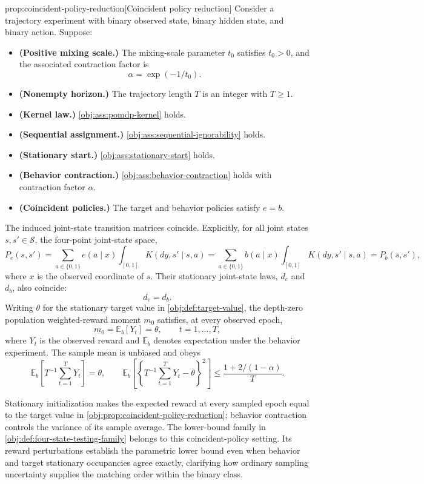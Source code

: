 \documentclass[11pt]{article}
\begin{document}
\begin{propositionv}{prop:coincident-policy-reduction}[Coincident policy reduction]
Consider a trajectory experiment with binary observed state, binary hidden state, and binary action. Suppose:
\begin{itemize}
\item \textbf{(Positive mixing scale.)} The mixing-scale parameter \(t_0\) satisfies \(t_0>0\), and the associated contraction factor is
\[
\alpha=\exp(-1/t_0).
\]
\item \textbf{(Nonempty horizon.)} The trajectory length \(T\) is an integer with \(T\geq 1\).
\item \textbf{(Kernel law.)} \cref{obj:ass:pomdp-kernel} holds.
\item \textbf{(Sequential assignment.)} \cref{obj:ass:sequential-ignorability} holds.
\item \textbf{(Stationary start.)} \cref{obj:ass:stationary-start} holds.
\item \textbf{(Behavior contraction.)} \cref{obj:ass:behavior-contraction} holds with contraction factor \(\alpha\).
\item \textbf{(Coincident policies.)} The target and behavior policies satisfy \(e=b\).
\end{itemize}
The induced joint-state transition matrices coincide. Explicitly, for all joint states \(s,s'\in\mathcal S\), the four-point joint-state space,
\[
P_e(s,s')
=
\sum_{a\in\{0,1\}}e(a\mid x)
   \int_{[0,1]}K(dy,s'\mid s,a)
=
\sum_{a\in\{0,1\}}b(a\mid x)
   \int_{[0,1]}K(dy,s'\mid s,a)
=
P_b(s,s'),
\]
where \(x\) is the observed coordinate of \(s\). Their stationary joint-state laws, \(d_e\) and \(d_b\), also coincide:
\[
d_e=d_b.
\]
Writing \(\theta\) for the stationary target value in \cref{obj:def:target-value}, the depth-zero population weighted-reward moment \(m_0\) satisfies, at every observed epoch,
\[
m_0=\mathbb E_b[Y_t]=\theta,
\qquad t=1,\ldots,T,
\]
where \(Y_t\) is the observed reward and \(\mathbb E_b\) denotes expectation under the behavior experiment. The sample mean is unbiased and obeys
\[
\mathbb E_b\!\left[T^{-1}\sum_{t=1}^{T}Y_t\right]=\theta,
\qquad
\mathbb E_b\!\left[
\left\{T^{-1}\sum_{t=1}^{T}Y_t-\theta\right\}^{2}
\right]
\leq
\frac{1+2/(1-\alpha)}{T}.
\]
\end{propositionv}

Stationary initialization makes the expected reward at every sampled epoch equal to the target value in \cref{obj:prop:coincident-policy-reduction}; behavior contraction controls the variance of its sample average. The lower-bound family in \cref{obj:def:four-state-testing-family} belongs to this coincident-policy setting. Its reward perturbations establish the parametric lower bound even when behavior and target stationary occupancies agree exactly, clarifying how ordinary sampling uncertainty supplies the matching order within the binary class.
\end{document}
